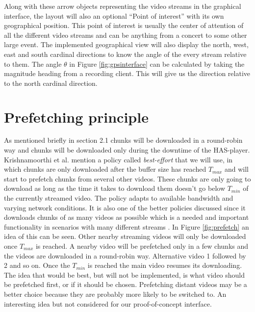 Along with these arrow objects representing the video streams in the graphical interface, the layout will also an optional “Point of interest” with its own geographical position. This point of interest is usually the center of attention of all the different video streams and can be anything from a concert to some other large event. The implemented geographical view will also display the north, west, east and south cardinal directions to know the angle of the every stream relative to them. The angle $\theta$ in Figure \ref{fig:gpsinterface} can be calculated by taking the magnitude heading from a recording client. This will give us the direction relative to the north cardinal direction.

\section{Prefetching principle}
\label{sec:prefetching}

As mentioned briefly in section 2.1 chunks will be downloaded in a round-robin way and chunks will be downloaded only during the downtime of the HAS-player. Krishnamoorthi et al. \cite{bandawarePrefetch} mention a policy called \textit{best-effort} that we will use, in which chunks are only downloaded after the buffer size has reached $T_{max}$ and will start to prefetch chunks from several other videos. These chunks are only going to download as long as the time it takes to download them doesn't go below $T_{min}$ of the currently streamed video. The policy adapts to available bandwidth and varying network conditions. It is also one of the better policies discussed since it downloads chunks of as many videos as possible which is a needed and important functionality in  scenarios with many different streams \cite{bandawarePrefetch}. In Figure \ref{fig:prefetch} an idea of this can be seen. Other nearby streaming videos will only be downloaded once $T_{max}$ is reached. A nearby video will be prefetched only in a few chunks and the videos are downloaded in a round-robin way. Alternative video 1 followed by 2 and so on. Once the $T_{min}$ is reached the main video resumes its downloading. The idea that would be best, but will not be implemented, is what video should be prefetched first, or if it should be chosen. Prefetching distant videos may be a better choice because they are probably more likely to be switched to. An interesting idea but not considered for our proof-of-concept interface.


